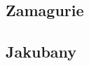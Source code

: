 \documentclass[a4paper]{book}
\begin{document}
\begin{center}
\chapter*{Zamagurie}
\section*{Jakubany}
{%
\parindent 0pt
\noindent
\ifx\preLilyPondExample \undefined
\else
  \expandafter\preLilyPondExample
\fi
\def\lilypondbook{}%

\ifx\postLilyPondExample \undefined
\else
  \expandafter\postLilyPondExample
\fi
}
{%
\parindent 0pt
\noindent
\ifx\preLilyPondExample \undefined
\else
  \expandafter\preLilyPondExample
\fi
\def\lilypondbook{}%

\ifx\postLilyPondExample \undefined
\else
  \expandafter\postLilyPondExample
\fi
}
{%
\parindent 0pt
\noindent
\ifx\preLilyPondExample \undefined
\else
  \expandafter\preLilyPondExample
\fi
\def\lilypondbook{}%

\ifx\postLilyPondExample \undefined
\else
  \expandafter\postLilyPondExample
\fi
}


\end{center}
\end{document}
